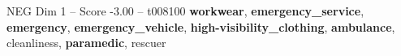 \begin{textsample}{NEG Dim 1 – Score -3.00 – t008100}  \label{ex:f1_neg_026}
\textbf{workwear}, \textbf{emergency\_service}, \textbf{emergency}, \textbf{emergency\_vehicle}, \textbf{high-visibility\_clothing}, \textbf{ambulance}, cleanliness, \textbf{paramedic}, rescuer

\end{textsample}
